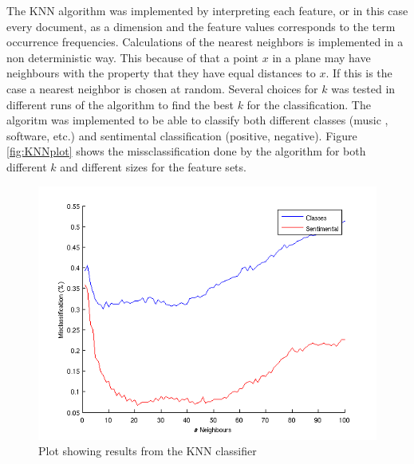 The KNN algorithm was implemented by interpreting each feature, or in this case
every document, as a dimension and the feature values corresponds to the term
occurrence frequencies. Calculations of the nearest neighbors is
implemented in a non deterministic way. This because of that a point $x$ in a plane
may have neighbours with the property that they have equal distances to
$x$. If this is the case a nearest neighbor is chosen at random. Several choices
for $k$ was tested in different runs of the algorithm to find the best $k$ for
the classification. The algoritm was implemented to be able to classify both
different classes (music , software, etc.) and sentimental classification
(positive, negative). Figure \ref{fig:KNNplot} shows the missclassification done by the
algorithm for both different $k$ and different sizes for the feature sets.
\begin{figure}[H]
\begin{center}
\caption{Plot showing results from the KNN classifier}
\includegraphics[scale=0.6]{fig/knn_2000words_testdata100_unigram}
\end{center}
\end{figure}
\label{fig:KNNplot}

%
